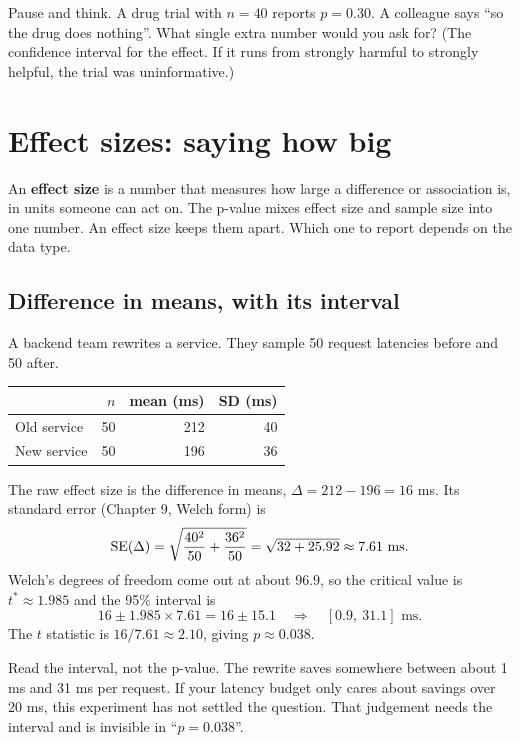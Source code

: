 \begin{recoverybox}
Pause and think. A drug trial with $n=40$ reports $p=0.30$. A colleague says
``so the drug does nothing''. What single extra number would you ask for?
(The confidence interval for the effect. If it runs from strongly harmful to
strongly helpful, the trial was uninformative.)
\end{recoverybox}

\section{Effect sizes: saying how big}
\label{sec:pitfalls-effect}

An \textbf{effect size} is a number that measures how large a difference or
association is, in units someone can act on. The p-value mixes effect size and
sample size into one number. An effect size keeps them apart. Which one to report
depends on the data type.

\subsection{Difference in means, with its interval}

A backend team rewrites a service. They sample 50 request latencies before and 50
after.

\begin{center}
\begin{tabular}{lrrr}
\toprule
 & $n$ & mean (ms) & SD (ms) \\
\midrule
Old service & 50 & 212 & 40 \\
New service & 50 & 196 & 36 \\
\bottomrule
\end{tabular}
\end{center}

The raw effect size is the difference in means, $\Delta = 212-196 = 16$ ms. Its
standard error (Chapter 9, Welch form) is
\[
  \operatorname{SE}(\Delta) = \sqrt{\frac{40^2}{50}+\frac{36^2}{50}}
  = \sqrt{32+25.92} \approx 7.61 \text{ ms}.
\]
Welch's degrees of freedom come out at about $96.9$, so the critical value is
$t^*\approx 1.985$ and the 95\% interval is
\[
  16 \pm 1.985\times 7.61 = 16 \pm 15.1 \quad\Longrightarrow\quad [0.9,\ 31.1]\text{ ms}.
\]
The $t$ statistic is $16/7.61\approx 2.10$, giving $p\approx 0.038$.

Read the interval, not the p-value. The rewrite saves somewhere between about
1 ms and 31 ms per request. If your latency budget only cares about savings over
20 ms, this experiment has not settled the question. That judgement needs the
interval and is invisible in ``$p=0.038$''.

